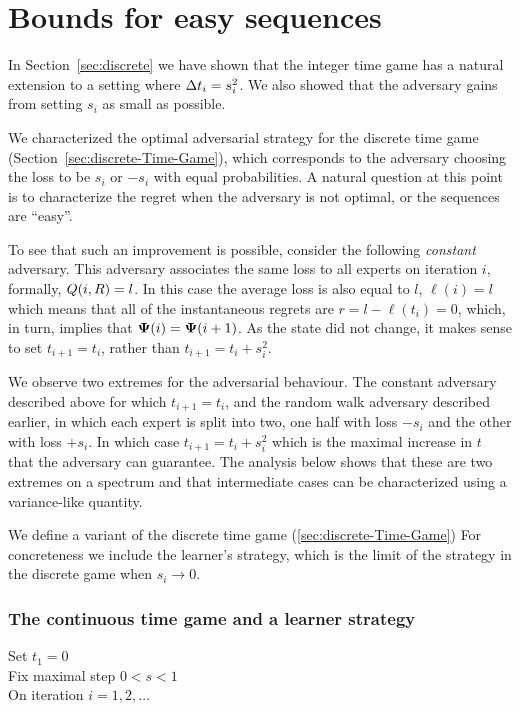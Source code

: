 \documentclass{article}[12pt]
\begin{document}
\section{Bounds for easy sequences} \label{sec:easy}
In Section~\ref{sec:discrete} we have shown that the integer time game
has a natural extension to a setting where $\Delta t_i = s_i^2$. We
also showed that the adversary gains from setting $s_i$ as small as
possible.

We characterized the optimal adversarial strategy for the discrete
time game (Section~\ref{sec:discrete-Time-Game}), which corresponds
to the adversary choosing the loss to be $s_i$ or $-s_i$ with equal
probabilities. A natural question at this point is to characterize the
regret when the adversary is not optimal, or the sequences are ``easy''.

To see that such an improvement is possible, consider the following
{\em constant} adversary. This adversary associates the same loss to
all experts on iteration $i$, formally, $Q(i,R) = l$. In this
case the average loss is also equal to $l$, $\ell(i)=l$ which means
that all of the instantaneous regrets are $r=l-\ell(t_i) = 0$, which,
in turn, implies that ${\bf \Psi}(i) = {\bf \Psi}(i+1)$. As the state did not
change, it makes sense to set $t_{i+1}=t_i$, rather than
$t_{i+1}=t_i+s_i^2$.

We observe two extremes for the adversarial behaviour. The constant
adversary described above for which $t_{i+1} = t_i$, and the random walk adversary described
earlier, in which each expert is split into two, one half with loss
$-s_i$ and the other with loss $+s_i$. In which case $t_{i+1} =
t_i+s_i^2$ which is the maximal increase in $t$ that the adversary can
guarantee. The analysis below shows that these are two extremes on a
spectrum and that intermediate cases can be characterized using a
variance-like quantity.

We define a variant of the discrete time game
(\ref{sec:discrete-Time-Game}) For concreteness we include the
learner's strategy, which is the limit of the strategy in the discrete
game when $s_i \to 0$.

\subsubsection{The continuous time game and a learner strategy}
\label{sec:contin-Time-Game}
Set $t_1=0$ \\
Fix maximal step $0<s<1$ \\
On iteration $i=1,2,\ldots$
\end{document}
